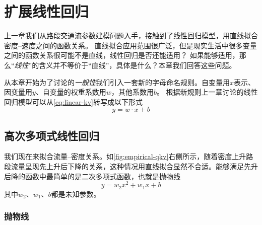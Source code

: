 \chapter{扩展线性回归}\label{cht:lr-extended}

上一章我们从路段交通流参数建模问题入手，接触到了线性回归模型，用直线拟合密度--速度之间的函数关系。
直线拟合应用范围很广泛，但是现实生活中很多变量之间的函数关系很可能不是直线，线性回归是否还能适用？
如果能够适用，那么“\emph{线性}”的含义并不等价于“直线”，具体是什么？本章我们回答这些问题。

从本章开始为了讨论的\emph{一般性}我们引入一套新的字母命名规则。自变量用$x$表示、因变量用$y$、自变量的权重系数用$w$，其他系数用$b$。
根据新规则上一章讨论的线性回归模型可以从\cref{eq:linear-kv}转写成以下形式
\begin{equation*}
    y=w\cdot x+b
\end{equation*}

\section{高次多项式线性回归}
我们现在来拟合流量--密度关系。如\cref{fig:empirical-qkv}右侧所示，随着密度上升路段流量呈现先上升后下降的关系，这种情况用直线拟合显然不合适。能够满足先升后降的函数中最简单的是二次多项式函数，也就是抛物线
\begin{equation}
    y=w_2 x^2 + w_1 x + b
\end{equation}
其中$w_2$、$w_1$、$b$都是未知参数。

\subsection{抛物线}

